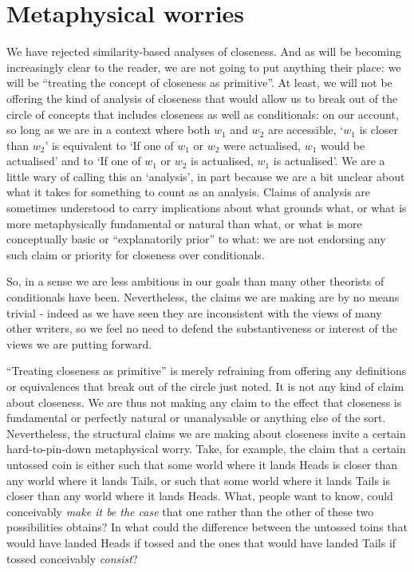 \documentclass[If.tex]{subfiles}
\begin{document}
\section{Metaphysical worries}
We have rejected similarity-based analyses of closeness. And as will be becoming increasingly clear to the reader, we are not going to put anything their place: we will be “treating the concept of closeness as primitive”. At least, we will not be offering the kind of analysis of closeness that would allow us to break out of the circle of concepts that includes closeness as well as conditionals: on our account, so long as we are in a context where both $w_1$ and $w_2$ are accessible, ‘$w_1$ is closer than $w_2$’ is equivalent to ‘If one of $w_1$ or $w_2$ were actualised, $w_1$ would be actualised’ and to ‘If one of $w_1$ or $w_2$ is actualised, $w_1$ is actualised’. We are a little wary of calling this an ‘analysis’, in part because we are a bit unclear about what it takes for something to count as an analysis. Claims of analysis are sometimes understood to carry implications about what grounds what, or what is more metaphysically fundamental or natural than what, or what is more conceptually basic or “explanatorily prior” to what: we are not endorsing any such claim or priority for closeness over conditionals.

So, in a sense we are less ambitious in our goals than many other theorists of conditionals have been. Nevertheless, the claims we are making are by no means trivial - indeed as we have seen they are inconsistent with the views of many other writers, so we feel no need to defend the substantiveness or interest of the views we are putting forward.

“Treating closeness as primitive” is merely refraining from offering any definitions or equivalences that break out of the circle just noted. It is not any kind of claim about closeness. We are thus not making any claim to the effect that closeness is fundamental or perfectly natural or unanalysable or anything else of the sort. Nevertheless, the structural claims we are making about closeness invite a certain hard-to-pin-down metaphysical worry. Take, for example, the claim that a certain untossed coin is either such that some world where it lands Heads is closer than any world where it lands Tails, or such that some world where it lands Tails is closer than any world where it lands Heads. What, people want to know, could conceivably \emph{make it be the case} that one rather than the other of these two possibilities obtains?  In what could the difference between the untossed toins that would have landed Heads if tossed and the ones that would have landed Tails if tossed conceivably \emph{consist}?
\end{document}

